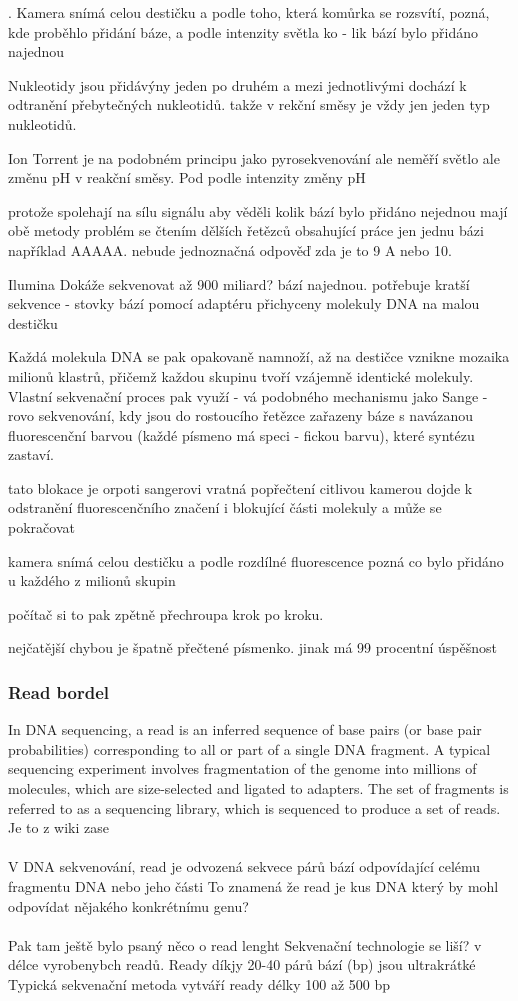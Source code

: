 \documentclass[czech,DP]{thesiskiv}
\numberwithin{equation}{section}
\begin{document}
. Kamera
snímá celou destičku a podle toho, která
komůrka se rozsvítí, pozná, kde proběhlo
přidání báze, a podle intenzity světla ko -
lik bází bylo přidáno najednou

Nukleotidy jsou přidávýny jeden po druhém a mezi jednotlivými dochází k odtranění přebytečných nukleotidů.
takže v rekční směsy je vždy jen jeden typ nukleotidů.


Ion Torrent je na podobném principu jako pyrosekvenování
ale neměří světlo ale změnu pH v reakční směsy. Pod
podle intenzity změny pH

protože spolehají na sílu signálu aby věděli kolik bází bylo přidáno  nejednou mají obě metody problém se čtením dělších řetězců obsahující práce jen jednu bázi například AAAAA. nebude jednoznačná odpověď zda je to 9 A nebo 10.

Ilumina
Dokáže sekvenovat až 900 miliard? bází najednou. 
potřebuje kratší sekvence - stovky bází
pomocí adaptéru přichyceny molekuly DNA na malou destičku

Každá molekula DNA se pak opakovaně namnoží, až na destičce vznikne
mozaika milionů klastrů, přičemž každou
skupinu tvoří vzájemně identické molekuly. Vlastní sekvenační proces pak využí -
vá podobného mechanismu jako Sange -
rovo sekvenování, kdy jsou do rostoucího
řetězce zařazeny báze s navázanou fluorescenční barvou (každé písmeno má speci -
fickou barvu), které syntézu zastaví.

tato blokace je orpoti sangerovi vratná
 popřečtení citlivou kamerou dojde k odstranění fluorescenčního značení i blokující části molekuly
 a může se pokračovat
 
 kamera snímá celou destičku
 a podle rozdílné fluorescence pozná co bylo přidáno u každého z milionů skupin
 
 počítač si to pak zpětně přechroupa krok po kroku.
 

nejčatější chybou je špatně přečtené písmenko. 
jinak má 99 procentní úspěšnost

\subsubsection{Read bordel}
In DNA sequencing, a read is an inferred sequence of base pairs (or base pair probabilities) corresponding to all or part of a single DNA fragment. A typical sequencing experiment involves fragmentation of the genome into millions of molecules, which are size-selected and ligated to adapters. The set of fragments is referred to as a sequencing library, which is sequenced to produce a set of reads. Je to z wiki zase
\\
\\
V DNA sekvenování, read je odvozená sekvece párů bází odpovídající celému fragmentu DNA nebo jeho části
To znamená že read je kus DNA který by mohl odpovídat nějakého konkrétnímu genu? 
\\
\\
Pak tam ještě bylo psaný něco o read lenght
Sekvenační technologie se liší? v délce vyrobenybch readů. 
Ready díkjy 20-40 párů bází (bp) jsou ultrakrátké
Typická sekvenační metoda vytváří ready délky 100 až 500 bp
\end{document}
